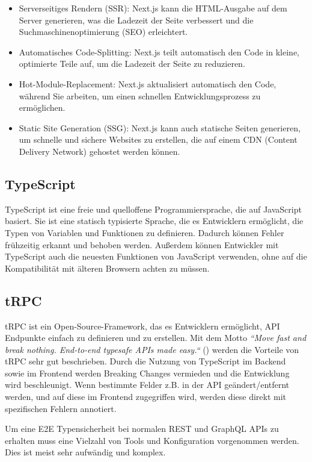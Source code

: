 \begin{itemize}
    \item Serverseitiges Rendern (SSR): Next.js kann die HTML-Ausgabe auf dem Server generieren, was die Ladezeit der Seite verbessert und die Suchmaschinenoptimierung (SEO) erleichtert.
    \item Automatisches Code-Splitting: Next.js teilt automatisch den Code in kleine, optimierte Teile auf, um die Ladezeit der Seite zu reduzieren.
    \item Hot-Module-Replacement: Next.js aktualisiert automatisch den Code, während Sie arbeiten, um einen schnellen Entwicklungsprozess zu ermöglichen.
    \item Static Site Generation (SSG): Next.js kann auch statische Seiten generieren, um schnelle und sichere Websites zu erstellen, die auf einem CDN (Content Delivery Network) gehostet werden können.
\end{itemize}

\subsection{TypeScript}

TypeScript ist eine freie und quelloffene Programmiersprache, die auf JavaScript basiert. Sie ist eine statisch typisierte Sprache, die es Entwicklern ermöglicht, die Typen von Variablen und Funktionen zu definieren. Dadurch können Fehler frühzeitig erkannt und behoben werden. Außerdem können Entwickler mit TypeScript auch die neuesten Funktionen von JavaScript verwenden, ohne auf die Kompatibilität mit älteren Browsern achten zu müssen.

\subsection{tRPC}

tRPC ist ein Open-Source-Framework, das es Entwicklern ermöglicht, API Endpunkte einfach zu definieren und zu erstellen. Mit dem Motto \emph{``Move fast and break nothing. End-to-end typesafe APIs made easy.``} () werden die Vorteile von tRPC sehr gut beschrieben. Durch die Nutzung von TypeScript im Backend sowie im Frontend werden Breaking Changes vermieden und die Entwicklung wird beschleunigt. Wenn bestimmte Felder z.B. in der API geändert/entfernt werden, und auf diese im Frontend zugegriffen wird, werden diese direkt mit spezifischen Fehlern annotiert.

Um eine E2E Typensicherheit bei normalen REST und GraphQL APIs zu erhalten muss eine Vielzahl von Tools und Konfiguration vorgenommen werden. Dies ist meist sehr aufwändig und komplex.

